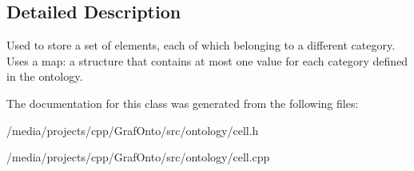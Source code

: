 \subsection{\-Detailed \-Description}
\-Used to store a set of elements, each of which belonging to a different category. \-Uses a map\-: a structure that contains at most one value for each category defined in the ontology. 

\-The documentation for this class was generated from the following files\-:\begin{DoxyCompactItemize}
\item 
/media/projects/cpp/\-Graf\-Onto/src/ontology/cell.\-h\item 
/media/projects/cpp/\-Graf\-Onto/src/ontology/cell.\-cpp\end{DoxyCompactItemize}
